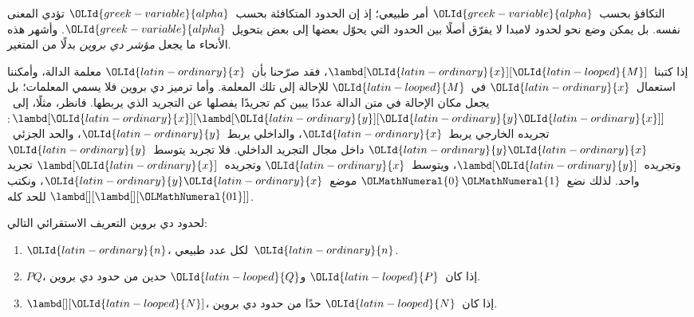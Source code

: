 \documentclass[../../../include/open-logic-section]{subfiles}
\begin{document}


التكافؤ بحسب~${\OLId{greek-variable}{alpha}}$ أمر طبيعي؛ إذ إن الحدود المتكافئة بحسب~${\OLId{greek-variable}{alpha}}$
تؤدي المعنى نفسه. بل يمكن وضع نحو لحدود لامبدا لا يفرّق أصلًا بين الحدود
التي يحوّل بعضها إلى بعض بتحويل~${\OLId{greek-variable}{alpha}}$. وأشهر هذه الأنحاء ما يجعل
\emph{مؤشر دي بروين} بدلًا من المتغير.

إذا كتبنا~$\lambd[{\OLId{latin-ordinary}{x}}][{\OLId{latin-looped}{M}}]$، فقد صرّحنا بأن~${\OLId{latin-ordinary}{x}}$ معلمة الدالة، وأمكننا استعمال~${\OLId{latin-ordinary}{x}}$
في~${\OLId{latin-looped}{M}}$ للإحالة إلى تلك المعلمة. وأما ترميز دي بروين فلا يسمي المعلمات؛
بل يجعل مكان الإحالة في متن الدالة عددًا يبين كم تجريدًا يفصلها عن التجريد الذي يربطها.
فانظر، مثلًا، إلى~$\lambd[{\OLId{latin-ordinary}{x}}][\lambd[{\OLId{latin-ordinary}{y}}][{\OLId{latin-ordinary}{y}} {\OLId{latin-ordinary}{x}}]]$: تجريده الخارجي يربط~${\OLId{latin-ordinary}{x}}$، والداخلي يربط~${\OLId{latin-ordinary}{y}}$،
والحد الجزئي~${\OLId{latin-ordinary}{y}} {\OLId{latin-ordinary}{x}}$ داخل مجال التجريد الداخلي.
فلا تجريد يتوسط~${\OLId{latin-ordinary}{y}}$ وتجريده~$\lambd[{\OLId{latin-ordinary}{y}}]$، ويتوسط~${\OLId{latin-ordinary}{x}}$ وتجريده~$\lambd[{\OLId{latin-ordinary}{x}}]$ تجريد واحد.
لذلك نضع~${\OLMathNumeral{0}}\, {\OLMathNumeral{1}}$ موضع~${\OLId{latin-ordinary}{y}} {\OLId{latin-ordinary}{x}}$، ونكتب
$\lambd[][\lambd[][{\OLMathNumeral{01}}]]$ للحد كله.

\begin{defn}
  لحدود دي بروين التعريف الاستقرائي التالي:
  \begin{enumerate}
  \item ${\OLId{latin-ordinary}{n}}$، لكل عدد طبيعي~${\OLId{latin-ordinary}{n}}$.
  \item $PQ$، إذا كان~${\OLId{latin-looped}{P}}$ و${\OLId{latin-looped}{Q}}$ حدين من حدود دي بروين.
  \item $\lambd[][{\OLId{latin-looped}{N}}]$، إذا كان~${\OLId{latin-looped}{N}}$ حدًا من حدود دي بروين.
  \end{enumerate}
\end{defn}
\end{document}
